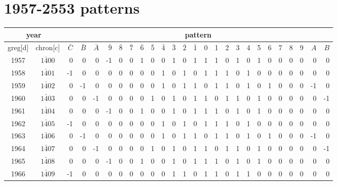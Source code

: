 \documentclass[12 pt]{article}%
\begin{document}
\section{1957-2553 patterns}
\renewcommand{\arraystretch}{1.5}
\begin{tiny}
  \begin{centering}
    \begin{longtable}{|c|c||rrrrrrrrrrrrrrrrrrrrrrrr|}
      \hline
      \multicolumn{2}{|c||}{year} & \multicolumn{24}{c|}{pattern}\\
      \hline
      greg[d] & chron[c] & $\bar C$ & $\bar B$ & $\bar A$ & $\bar 9$ & $\bar 8$ & $\bar 7$ & $\bar 6$ & $\bar 5$ & $\bar 4$ & $\bar 3$ & $\bar 2$ & $\bar 1$ & 0 & 1 & 2 & 3 & 4 & 5 & 6 & 7 & 8 & 9 & $A$ & $B$ \\
      \hline\hline
      1957 & $1\bar400$ & 0 & 0 & 0 & -1 & 0 & 0 & 1 & 0 & 0 & 1 & 0 & 1 & 1 & 1 & 0 & 1 & 0 & 1 & 0 & 0 & 0 & 0 & 0 & 0 \\
      \hline
      1958 & $1\bar401$ & -1 & 0 & 0 & 0 & 0 & 0 & 0 & 0 & 1 & 0 & 1 & 0 & 1 & 1 & 1 & 0 & 1 & 0 & 0 & 0 & 0 & 0 & 0 & 0 \\
      \hline
      1959 & $1\bar402$ & 0 & -1 & 0 & 0 & 0 & 0 & 0 & 0 & 1 & 0 & 1 & 1 & 0 & 1 & 1 & 0 & 1 & 0 & 1 & 0 & 0 & 0 & -1 & 0 \\
      \hline
      1960 & $1\bar403$ & 0 & 0 & -1 & 0 & 0 & 0 & 0 & 1 & 0 & 1 & 0 & 1 & 1 & 0 & 1 & 1 & 0 & 1 & 0 & 0 & 0 & 0 & 0 & -1 \\
      \hline
      1961 & $1\bar404$ & 0 & 0 & 0 & -1 & 0 & 0 & 1 & 0 & 0 & 1 & 0 & 1 & 1 & 1 & 0 & 1 & 0 & 1 & 0 & 0 & 0 & 0 & 0 & 0 \\
      \hline
      1962 & $1\bar405$ & -1 & 0 & 0 & 0 & 0 & 0 & 0 & 0 & 1 & 0 & 1 & 0 & 1 & 1 & 1 & 0 & 1 & 0 & 0 & 0 & 0 & 0 & 0 & 0 \\
      \hline
      1963 & $1\bar406$ & 0 & -1 & 0 & 0 & 0 & 0 & 0 & 0 & 1 & 0 & 1 & 1 & 0 & 1 & 1 & 0 & 1 & 0 & 1 & 0 & 0 & 0 & -1 & 0 \\
      \hline
      1964 & $1\bar407$ & 0 & 0 & -1 & 0 & 0 & 0 & 0 & 1 & 0 & 1 & 0 & 1 & 1 & 0 & 1 & 1 & 0 & 1 & 0 & 0 & 0 & 0 & 0 & -1 \\
      \hline
      1965 & $1\bar408$ & 0 & 0 & 0 & -1 & 0 & 0 & 1 & 0 & 0 & 1 & 0 & 1 & 1 & 1 & 0 & 1 & 0 & 1 & 0 & 0 & 0 & 0 & 0 & 0 \\
      \hline
      1966 & $1\bar409$ & -1 & 0 & 0 & 0 & 0 & 0 & 0 & 0 & 0 & 1 & 1 & 0 & 1 & 1 & 0 & 1 & 1 & 0 & 0 & 0 & 0 & 0 & 0 & 0 \\
      \hline

\end{longtable}
\end{centering}
\end{tiny}
\end{document}
